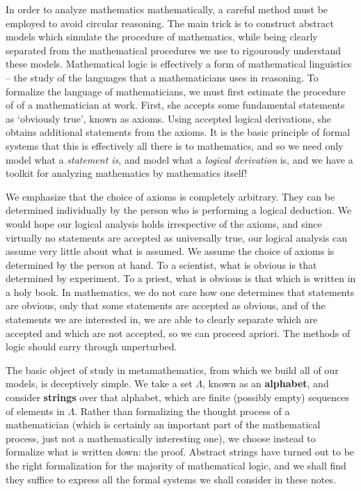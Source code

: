 In order to analyze mathematics mathematically, a careful method must be employed to avoid circular reasoning. The main trick is to construct abstract models which simulate the procedure of mathematics, while being clearly separated from the mathematical procedures we use to rigourously understand these models. Mathematical logic is effectively a form of mathematical linguistics -- the study of the languages that a mathematicians uses in reasoning. To formalize the language of mathematicians, we must first estimate the procedure of of a mathematician at work. First, she accepts some fundamental statements as `obviously true', known as axioms. Using accepted logical derivations, she obtains additional statements from the axioms. It is the basic principle of formal systems that this is effectively all there is to mathematics, and so we need only model what a {\it statement is}, and model what a {\it logical derivation} is, and we have a toolkit for analyzing mathematics by mathematics itself!

We emphasize that the choice of axioms is completely arbitrary. They can be determined individually by the person who is performing a logical deduction. We would hope our logical analysis holds irrespective of the axioms, and since virtually no statements are accepted as universally true, our logical analysis can assume very little about what is assumed. We assume the choice of axioms is determined by the person at hand. To a scientist, what is obvious is that determined by experiment. To a priest, what is obvious is that which is written in a holy book. In mathematics, we do not care how one determines that statements are obvious, only that some statements are accepted as obvious, and of the statements we are interested in, we are able to clearly separate which are accepted and which are not accepted, so we can proceed apriori. The methods of logic should carry through unperturbed.

The basic object of study in metamathematics, from which we build all of our models, is deceptively simple. We take a set $\Lambda$, known as an {\bf alphabet}, and consider {\bf strings} over that alphabet, which are finite (possibly empty) sequences of elements in $\Lambda$. Rather than formalizing the thought process of a mathematician (which is certainly an important part of the mathematical process, just not a mathematically interesting one), we choose instead to formalize what is written down: the proof. Abstract strings have turned out to be the right formalization for the majority of mathematical logic, and we shall find they suffice to express all the formal systems we shall consider in these notes.

